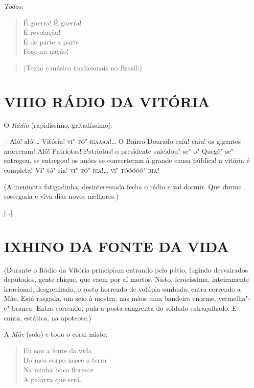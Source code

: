 {\emph{Todos}:

\begin{verse}
É guerra! É guerra!\\
É revolução!\\
É de parte a parte\\
Fogo na nação!
\end{verse}


\begin{quote}
(Texto e música tradicionais no Brasil.)
\end{quote}

\section*{VIII\break O RÁDIO DA VITÓRIA}

O \emph{Rádio} (rapidíssimo, gritadíssimo):

-- Alô! alô!\ldots{} Vitória! \textsc{vi"-tó"-riaaaa}!\ldots{} O Bairro Dourado caiu! caiu!
os gigantes morreram! Alô! Patriotas! Patriotas! o presidente
suicidou"-se"-o"-Quegê"-se"-entregou, se entregou! os anões se converteram à
grande causa pública! a vitória é completa! Vi"-tó"-ria! \textsc{vi"-tó"-ria}!\ldots{}
\textsc{vi"-tóóóóó"-ria!}

\hfill\parbox{150pt}{
(A meninota fatigadinha, desinteressada fecha o rádio e vai dormir. Que
durma sossegada e viva dias novos melhores.)
}

{[}\ldots{}{]}

\section*{IX\break HINO DA FONTE DA VIDA}\medskip

\hfill\parbox{150pt}{
(Durante o Rádio da Vitória principiam entrando pelo pátio, fugindo
desvairados deputados, gente chique, que caem por aí mortos. Nisto,
ferocíssima, inteiramente irracional, desgrenhada, o rosto horrendo de
volúpia sanhuda, entra correndo a Mãe. Está rasgada, um seio à mostra,
nas mãos uma bandeira enorme, vermelha"-e"-branca. Entra correndo, pula a
posta sangrenta do soldado estraçalhado. E canta, estática, na
apoteose.)
}\medskip

A \emph{Mãe} (solo) e todo o coral misto:

\begin{verse}
Eu sou a fonte da vida\\
Do meu corpo nasce a terra\\
Na minha boca floresce\\
A palavra que será.


\end{verse}}

